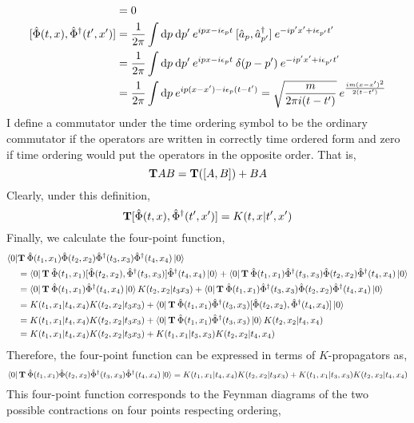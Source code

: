\documentclass[12pt]{extarticle}
\newcommand{\field}{\hat{\Phi}}
\newcommand{\dfield}{\hat{\Phi}^\dagger}
\begin{document}
\begin{align*}
[\field(t, x), \field(t', x')] & = 0 \\
[\field(t, x), \dfield(t', x')] & = \frac{1}{2 \pi} \int \d{p} \d{p'} e^{i p x - i \epsilon_p t}  \: [\a_p, \adag_{p'}] \: e^{- i p' x' + i \epsilon_{p'} t'} 
\\
& = \frac{1}{2 \pi} \int \d{p} \d{p'} e^{i p x - i \epsilon_p t}  \: \delta(p - p') \: e^{- i p' x' + i \epsilon_{p'} t'} 
\\
& = \frac{1}{2 \pi} \int \d{p} e^{i p (x - x') - i \epsilon_p (t - t')} = \sqrt{\frac{m}{2 \pi i(t - t')}} \: e^{\frac{i m (x - x')^2}{2 (t - t')}}
\end{align*}
I define a commutator under the time ordering symbol to be the ordinary commutator if the operators are written in correctly time ordered form and zero if time ordering would put the operators in the opposite order. That is,
\[ \bf{T} AB = \bf{T} ([A, B]) + BA  \]
Clearly, under this definition,
\[ \bf{T} [\field(t, x), \dfield(t', x')] = K(t, x | t', x') \]
Finally, we calculate the four-point function,
\begin{align*}
\bra{0} & \bf{T} \: \field(t_1, x_1) \field(t_2, x_2) \dfield(t_3, x_3) \dfield(t_4, x_4) \ket{0} 
\\
& = \bra{0} \bf{T} \: \field(t_1, x_1) [\field(t_2, x_2), \dfield(t_3, x_3)] \dfield(t_4, x_4) \ket{0} + \bra{0} \bf{T} \: \field(t_1, x_1) \dfield(t_3, x_3) \field(t_2, x_2) \dfield(t_4, x_4) \ket{0}
\\
& = \bra{0} \bf{T} \: \field(t_1, x_1) \dfield(t_4, x_4) \ket{0} K(t_2, x_2 | t_3 x_3) + \bra{0} \bf{T} \: \field(t_1, x_1) \dfield(t_3, x_3) \field(t_2, x_2) \dfield(t_4, x_4) \ket{0}
\\
& = K(t_1, x_1 | t_4, x_4) K(t_2, x_2 | t_3 x_3) + \bra{0} \bf{T} \: \field(t_1, x_1) \dfield(t_3, x_3) [\field(t_2, x_2), \dfield(t_4, x_4)] \ket{0}
\\
& = K(t_1, x_1 | t_4, x_4) K(t_2, x_2 | t_3 x_3) + \bra{0} \bf{T} \: \field(t_1, x_1) \dfield(t_3, x_3) \ket{0} K(t_2, x_2 | t_4, x_4)
\\
& = K(t_1, x_1 | t_4, x_4) K(t_2, x_2 | t_3 x_3) + K(t_1, x_1 | t_3, x_3) K(t_2, x_2 | t_4, x_4) 
\end{align*}
Therefore, the four-point function can be expressed in terms of $K$-propagators as,
\[\bra{0} \bf{T} \: \field(t_1, x_1) \field(t_2, x_2) \dfield(t_3, x_3) \dfield(t_4, x_4) \ket{0} = K(t_1, x_1 | t_4, x_4) K(t_2, x_2 | t_3 x_3) + K(t_1, x_1 | t_3, x_3) K(t_2, x_2 | t_4, x_4) \]
This four-point function corresponds to the Feynman diagrams of the two possible contractions on four points respecting ordering, 
\end{document}
